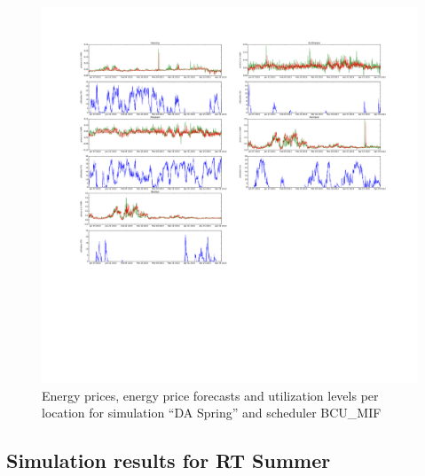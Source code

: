 \begin{figure}[htbp]
	\centering
	\vspace*{-0.6in}
	\hspace*{-1.4in}
		\includegraphics[width=1.60\textwidth]{figures/appendix_simulation_results/DA_Spring_scenario_7.pdf}
	\vspace*{-2.8in}
	\caption{Energy prices, energy price forecasts and utilization levels per location for simulation ``DA Spring'' and scheduler BCU\_MIF}
	\label{fig:app_DA_Spring_scenario_7}
\end{figure}


\FloatBarrier
\subsection{Simulation results for RT Summer}

